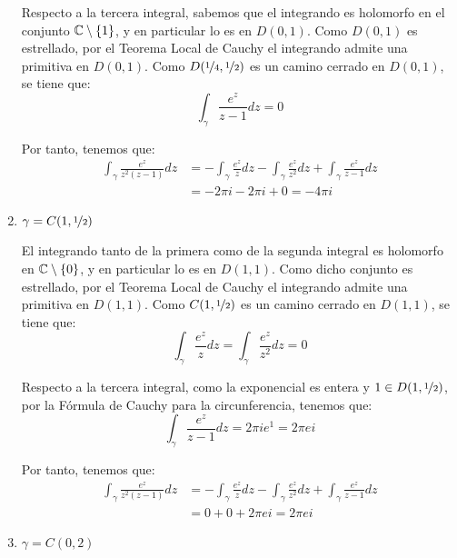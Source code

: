 \begin{ejercicio}
\begin{enumerate}
        Respecto a la tercera integral, sabemos que el integrando es holomorfo en el conjunto $\mathbb{C}\setminus \{1\}$, y en particular lo es en $D(0,1)$. Como $D(0,1)$ es estrellado, por el Teorema Local de Cauchy el integrando admite una primitiva en $D(0,1)$. Como $D(\nicefrac{1}{4},\nicefrac{1}{2})$ es un camino cerrado en $D(0,1)$, se tiene que:
        \begin{equation*}
            \int_{\gamma} \frac{e^z}{z-1}dz = 0
        \end{equation*}

        Por tanto, tenemos que:
        \begin{align*}
            \int_{\gamma} \frac{e^z}{z^2(z-1)}dz &= -\int_{\gamma} \frac{e^z}{z}dz - \int_{\gamma} \frac{e^z}{z^2}dz + \int_{\gamma} \frac{e^z}{z-1}dz\\
            &= -2\pi i - 2\pi i + 0 = -4\pi i
        \end{align*}


        \item $\gamma = C(1,\nicefrac{1}{2})$
        
        El integrando tanto de la primera como de la segunda integral es holomorfo en $\mathbb{C}\setminus\{0\}$, y en particular lo es en $D(1,1)$. Como dicho conjunto es estrellado, por el Teorema Local de Cauchy el integrando admite una primitiva en $D(1,1)$. Como $C(1,\nicefrac{1}{2})$ es un camino cerrado en $D(1,1)$, se tiene que:
        \begin{equation*}
            \int_{\gamma} \frac{e^z}{z}dz = \int_{\gamma} \frac{e^z}{z^2}dz = 0
        \end{equation*}

        Respecto a la tercera integral, como la exponencial es entera y $1\in D(1,\nicefrac{1}{2})$, por la Fórmula de Cauchy para la circunferencia, tenemos que:
        \begin{equation*}
            \int_{\gamma} \frac{e^z}{z-1}dz = 2\pi i e^1 = 2\pi e i
        \end{equation*}

        Por tanto, tenemos que:
        \begin{align*}
            \int_{\gamma} \frac{e^z}{z^2(z-1)}dz &= -\int_{\gamma} \frac{e^z}{z}dz - \int_{\gamma} \frac{e^z}{z^2}dz + \int_{\gamma} \frac{e^z}{z-1}dz\\
            &= 0 + 0 + 2\pi e i = 2\pi e i
        \end{align*}
        \item $\gamma = C(0,2)$
        

\end{enumerate}
\end{ejercicio}
